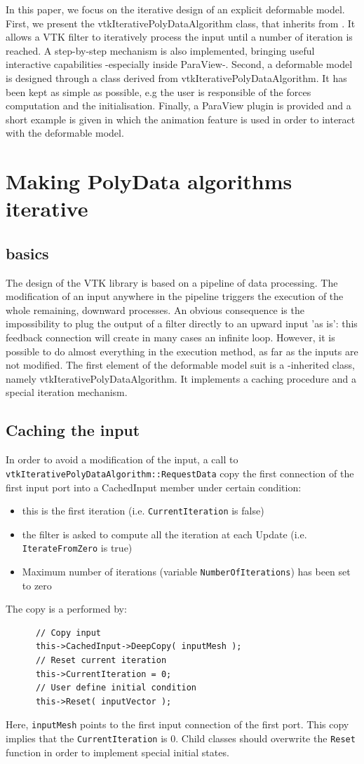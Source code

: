 \documentclass{InsightArticle}
\begin{document}
In this paper, we focus on the iterative design of an explicit deformable 
model. First, we present the vtkIterativePolyDataAlgorithm class, that 
inherits from . It allows a VTK filter to iteratively
process the input until a number of iteration is reached. A step-by-step
mechanism is also implemented, bringing useful interactive capabilities
-especially inside ParaView-. Second, a deformable model is designed through
a class derived from vtkIterativePolyDataAlgorithm. It has been kept as simple
as possible, e.g the user is responsible of the forces computation and the
initialisation. Finally, a ParaView plugin is provided and a short example 
is given in which the animation feature is used in order to interact with the 
deformable model.
%
\section{Making PolyData algorithms iterative}
%
\subsection{basics}
The design of the VTK library is based on a pipeline of data processing. The
modification of an input anywhere in the pipeline triggers the execution of the
whole remaining, downward processes. An obvious consequence is the 
impossibility to plug the output of a filter directly to an upward input 
'as is': this feedback connection will create in many cases an infinite loop.
However, it is possible to do almost everything in the execution method, as far
as the inputs are not modified. The first element of the deformable model suit
is a -inherited class, namely vtkIterativePolyDataAlgorithm.
It implements a caching procedure and a special iteration mechanism.
%
\subsection{Caching the input}
%
In order to avoid a modification of the input, a call to 
\verb!vtkIterativePolyDataAlgorithm::RequestData! copy the first connection of 
the first input port into a CachedInput member under certain condition:
\begin{itemize}
 \item this is the first iteration (i.e. \verb!CurrentIteration! is false)
 \item the filter is asked to compute all the iteration at each Update (i.e.
   \verb!IterateFromZero! is true)
 \item Maximum number of iterations (variable \verb!NumberOfIterations!) has 
been set to zero
\end{itemize}
The copy is a performed by:
\begin{verbatim}
      // Copy input
      this->CachedInput->DeepCopy( inputMesh );
      // Reset current iteration
      this->CurrentIteration = 0;
      // User define initial condition
      this->Reset( inputVector ); 
\end{verbatim}
%
Here, \verb!inputMesh! points to the first input connection of the first port.
This copy implies that the \verb!CurrentIteration! is 0. Child classes should
overwrite the \verb!Reset! function in order to implement special initial 
states.
%
\end{document}
